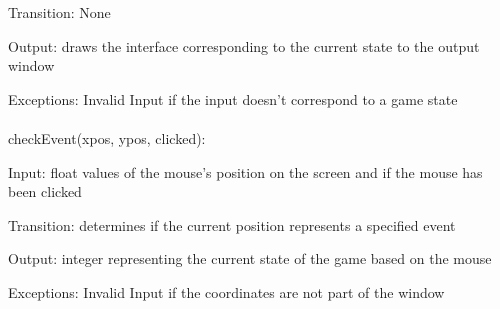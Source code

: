 \documentclass[12pt, titlepage]{article}
\begin{document}
		Transition: None
		
		Output: draws the interface corresponding to the current state to the output window
		
		Exceptions: Invalid Input if the input doesn't correspond to a game state\\
		\\
		checkEvent(xpos, ypos, clicked):
		
		Input: float values of the mouse's position on the screen and if the mouse has been clicked
		
		Transition: determines if the current position represents a specified event
		
		Output: integer representing the current state of the game based on the mouse
		
		Exceptions: Invalid Input if the coordinates are not part of the window
		
		
\end{document}
